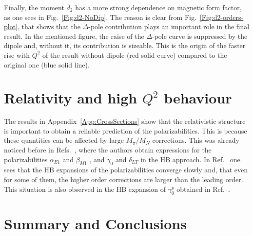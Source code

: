 \documentclass[prc,twocolumn,showpacs,preprintnumbers,amsmath,amssymb
,superscriptaddress,a4paper,nofootinbib
]{revtex4-1}
\begin{document}
Finally, the moment $\bar{d}_2$ has a more strong dependence on magnetic form factor, as one sees in Fig.~\ref{Fig:d2-NoDip}. 
The reason is clear from Fig.~\ref{Fig:d2-orders-plot}, that shows that the $\Delta$-pole contribution plays an important role in the final result. 
In the mentioned figure, the raise of the $\Delta$-pole curve is suppressed by the dipole and, without it, its contribution is sizeable.
This is the origin of the faster rise with $Q^2$ of the result without dipole (red solid curve) compared to the original one (blue solid line).







\section{Relativity and high $Q^2$ behaviour}
\label{Sec:Relativity-and-Q2behaviour}


The results in Appendix~\ref{App:CrossSections} show that the relativistic structure is important to obtain a reliable prediction of the polarizabilities. 
This is because these quantities can be affected by large $M_\pi/M_N$ corrections.
This was already noticed before in Refs.~\cite{Bernard:1991rq,Kao:2002cp}, where the authors obtain expressions for the polarizabilities $\alpha_{E1}$ and $\beta_{M1}$ \cite{Bernard:1991rq}, and $\gamma_0$  and $\delta_{LT}$ \cite{Kao:2002cp} in the HB approach. 
In Ref.~\cite{Bernard:1991rq} one sees that the HB expansions of the polarizabilities converge slowly and, that even for some of them, the higher order corrections are larger than the leading order. 
This situation is also observed in the HB expansion of $\gamma_0^p$ obtained in Ref.~\cite{Kao:2002cp}.

 

\section{Summary and Conclusions}\label{Sec:Summary}
\end{document}
